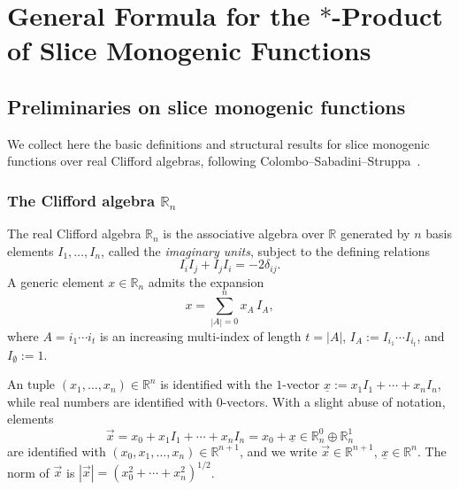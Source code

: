 \documentclass[11pt]{amsart}
\begin{document}




\section{\texorpdfstring{General Formula for the $*$-Product of Slice Monogenic Functions}{General Formula for the *-Product of Slice Monogenic Functions}}

\subsection{Preliminaries on slice monogenic functions}
\label{sec:slice-monogenic-preliminaries}

We collect here the basic definitions and structural results for slice monogenic functions over real Clifford algebras, following Colombo--Sabadini--Struppa~\cite{MR2684426}.

\subsubsection{The Clifford algebra $\mathbb{R}_n$}

The real Clifford algebra $\mathbb{R}_n$ is the associative algebra over $\mathbb{R}$ generated by $n$ basis elements $I_1, \ldots, I_n$, called the \emph{imaginary units}, subject to the defining relations
\begin{equation}\label{eq:clifford-relations}
I_i I_j + I_j I_i = -2 \delta_{ij}.
\end{equation}
A generic element $x \in \mathbb{R}_n$ admits the expansion
\[
x = \sum_{|A| = 0}^{n} x_A \, I_A,
\]
where $A = i_1 \cdots i_t$ is an increasing multi-index of length $t = |A|$, $I_A := I_{i_1} \cdots I_{i_t}$, and $I_\emptyset := 1$.

An tuple $(x_1, \ldots, x_n) \in \mathbb{R}^n$ is identified with the $1$-vector $\underline x := x_1 I_1 + \cdots + x_n I_n$, while real numbers are identified with $0$-vectors. With a slight abuse of notation, elements
\[
\vec x = x_0 + x_1 I_1 + \cdots + x_n I_n = x_0 + \underline x \in \mathbb{R}_n^0 \oplus \mathbb{R}_n^1
\]
are identified with $(x_0, x_1, \ldots, x_n) \in \mathbb{R}^{n+1}$, and we write $\vec x \in \mathbb{R}^{n+1}$, $\underline x \in \mathbb{R}^n$. The norm of $\vec x$ is $|\vec x| = (x_0^2 + \cdots + x_n^2)^{1/2}$.
\end{document}
